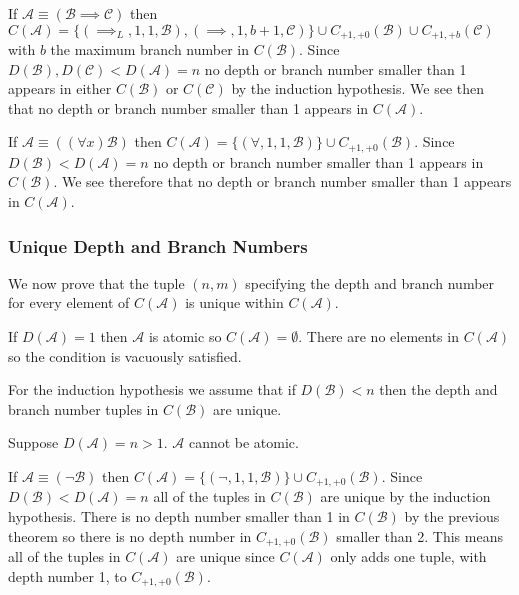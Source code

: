 \documentclass[12pt]{article}
\theoremstyle{break}
\theoremstyle{break}
\theoremstyle{break}
\theoremstyle{break}
\theoremstyle{break}
\newtheorem{informal definition}[definition]{Informal Definition}
\newcommand{\mc}[1]{\mathcal{#1}}
\begin{document}
If $\mc{A} \equiv (\mc{B} \implies \mc{C})$ then $C(\mc{A}) = \{(\implies_L, 1, 1, \mc{B}), (\implies, 1, b+1, \mc{C})\} \cup C_{+1, +0}(\mc{B}) \cup C_{+1, +b}(\mc{C})$ with $b$ the maximum branch number in $C(\mc{B})$. Since $D(\mc{B}), D(\mc{C}) < D(\mc{A}) = n$ no depth or branch number smaller than 1 appears in either $C(\mc{B})$ or $C(\mc{C})$ by the induction hypothesis. We see then that no depth or branch number smaller than 1 appears in $C(\mc{A})$.

If $\mc{A} \equiv ((\forall x)\mc{B})$ then $C(\mc{A}) = \{(\forall, 1, 1, \mc{B})\} \cup C_{+1, +0}(\mc{B})$. Since $D(\mc{B}) < D(\mc{A}) = n$ no depth or branch number smaller than 1 appears in $C(\mc{B})$. We see therefore that no depth or branch number smaller than 1 appears in $C(\mc{A})$.

\subsubsection{Unique Depth and Branch Numbers}

We now prove that the tuple $(n, m)$ specifying the depth and branch number for every element of $C(\mc{A})$ is unique within $C(\mc{A})$.

If $D(\mc{A}) = 1$ then $\mc{A}$ is atomic so $C(\mc{A}) = \emptyset$. There are no elements in $C(\mc{A})$ so the condition is vacuously satisfied.

For the induction hypothesis we assume that if $D(\mc{B}) < n$ then the depth and branch number tuples in $C(\mc{B})$ are unique.

Suppose $D(\mc{A}) = n > 1$. $\mc{A}$ cannot be atomic.

If $\mc{A} \equiv (\lnot \mc{B})$ then $C(\mc{A}) = \{(\lnot, 1, 1, \mc{B})\} \cup C_{+1, +0}(\mc{B})$. Since $D(\mc{B}) < D(\mc{A}) = n$ all of the tuples in $C(\mc{B})$ are unique by the induction hypothesis. There is no depth number smaller than 1 in $C(\mc{B})$ by the previous theorem so there is no depth number in $C_{+1, +0}(\mc{B})$ smaller than 2. This means all of the tuples in $C(\mc{A})$ are unique since $C(\mc{A})$ only adds one tuple, with depth number 1, to $C_{+1, +0}(\mc{B})$.
\end{document}
